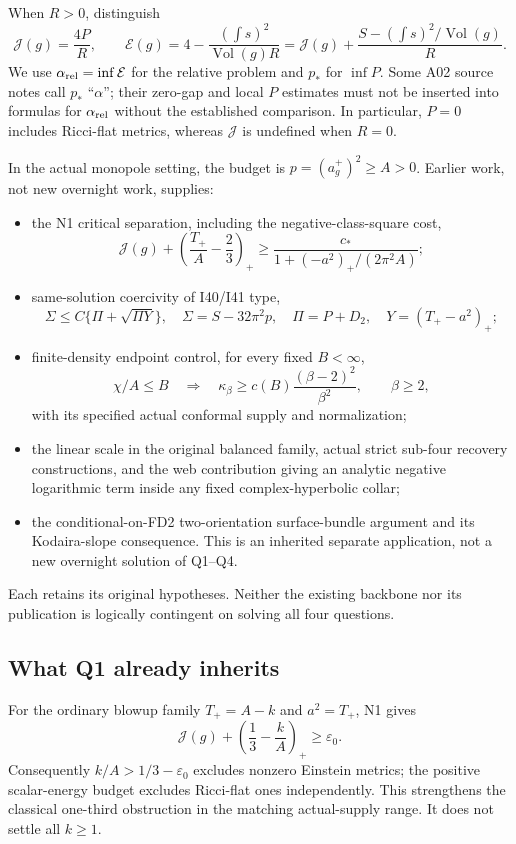 \documentclass[11pt]{article}
\newcommand{\Vol}{\operatorname{Vol}}
\theoremstyle{remark}
\begin{document}
When $R>0$, distinguish
\[
 \mathcal J(g)=\frac{4P}{R},\qquad
 \mathcal E(g)=4-\frac{(\int s)^2}{\Vol(g)R}
 =\mathcal J(g)+\frac{S-(\int s)^2/\Vol(g)}R.
\]
We use $\alpha_{\rm rel}=\inf\mathcal E$ for the relative problem and $p_*$
for $\inf P$. Some A02 source notes call $p_*$ ``$\alpha$''; their zero-gap
and local $P$ estimates must not be inserted into formulas for
$\alpha_{\rm rel}$ without the established comparison. In particular,
$P=0$ includes Ricci-flat metrics, whereas $\mathcal J$ is undefined when
$R=0$.

In the actual monopole setting, the budget is
$p=(a_g^+)^2\ge A>0$. Earlier work, not new overnight work, supplies:
\begin{itemize}
\item the N1 critical separation, including the negative-class-square cost,
\[
 \mathcal J(g)+\left(\frac{T_+}{A}-\frac23\right)_+
 \ge \frac{c_*}{1+(-a^2)_+/(2\pi^2A)};
\]
\item same-solution coercivity of I40/I41 type,
\[
 \Sigma\le C\{\Pi+\sqrt{\Pi Y}\},\quad
 \Sigma=S-32\pi^2p,\quad \Pi=P+D_2,\quad Y=(T_+-a^2)_+;
\]
\item finite-density endpoint control, for every fixed $B<\infty$,
\[
 \chi/A\le B\quad\Longrightarrow\quad
 \kappa_\beta\ge c(B)\frac{(\beta-2)^2}{\beta^2},\qquad\beta\ge2,
\]
with its specified actual conformal supply and normalization;
\item the linear scale in the original balanced family, actual strict
sub-four recovery constructions, and the web contribution giving an analytic
negative logarithmic term inside any fixed complex-hyperbolic collar;
\item the conditional-on-FD2 two-orientation surface-bundle argument and its
Kodaira-slope consequence. This is an inherited separate application, not a
new overnight solution of Q1--Q4.
\end{itemize}
Each retains its original hypotheses. Neither the existing backbone nor its
publication is logically contingent on solving all four questions.

\subsection{What Q1 already inherits}
For the ordinary blowup family $T_+=A-k$ and $a^2=T_+$, N1 gives
\[
 \mathcal J(g)+\left(\frac13-\frac kA\right)_+\ge\varepsilon_0.
\]
Consequently $k/A>1/3-\varepsilon_0$ excludes nonzero Einstein metrics;
the positive scalar-energy budget excludes Ricci-flat ones independently.
This strengthens the classical one-third obstruction in the matching
actual-supply range. It does not settle all $k\ge1$.
\end{document}
